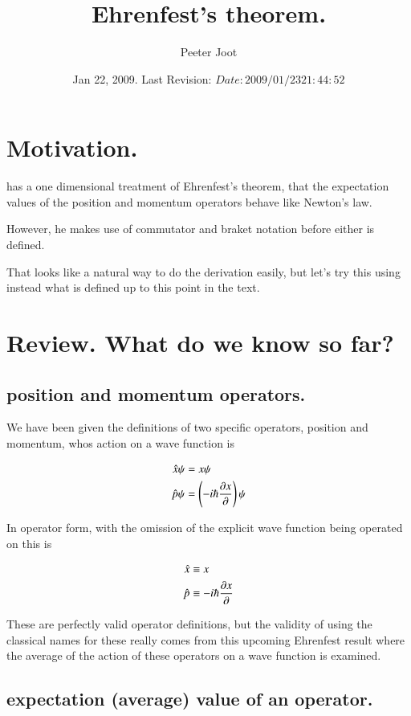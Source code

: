 \documentclass{article}
\title{ Ehrenfest's theorem. }
\author{Peeter Joot}
\date{ Jan 22, 2009.  Last Revision: $Date: 2009/01/23 21:44:52 $ }
\begin{document}
\maketitle{}

\section{ Motivation. }

\cite{mcmahon2005qmd} has a one dimensional treatment of Ehrenfest's theorem,
that the expectation values of the position and momentum operators behave
like Newton's law.

However, he makes use
of commutator and braket notation before either is defined.

That looks like a natural way to do the derivation easily, but let's try
this using instead what is defined up to this point in the text.

\section{ Review.  What do we know so far? }

\subsection{ position and momentum operators. }

We have been given the definitions of two specific operators, position and momentum, 
whos action on a wave function is

\begin{align*}
\hat{x} \psi &= x \psi \\
\hat{p} \psi &= \left(-i \hbar \frac{\partial{x}}{\partial {}}\right) \psi
\end{align*}

In operator form, with the omission of the explicit wave function being operated on this is

\begin{align*}
\hat{x} &\equiv x  \\
\hat{p} &\equiv -i \hbar \frac{\partial{x}}{\partial {}}
\end{align*}

These are perfectly valid operator definitions, but the validity of using the 
classical names for these really comes from this upcoming Ehrenfest result where
the average of the action of these operators on a wave function is examined.

\subsection{ expectation (average) value of an operator. }
\end{document}
